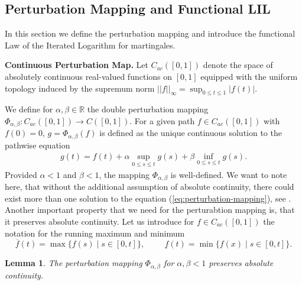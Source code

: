 \documentclass[11pt]{article}
\newtheorem{lemma}{Lemma}[section]
\theoremstyle{remark}
\newcommand{\R}{\mathbb{R}}
\begin{document}
\subsection{Perturbation Mapping and Functional LIL}
In this section we define the perturbation mapping and introduce the functional Law of the Iterated Logarithm for martingales.

\textbf{Continuous Perturbation Map.} Let $C_{ac}([0,1])$ denote the space of absolutely continuous real-valued functions on $[0,1]$ equipped with the uniform topology induced by the supremum norm $||f||_\infty = \sup_{0 \leq t \leq 1} |f(t)|$.

We define for $\alpha,\beta\in\R$ the double perturbation mapping $\Phi_{\alpha,\beta}: C_{ac}([0,1]) \to C([0,1])$. For a given path $f \in C_{ac}([0,1])$ with $f(0)=0$, $g = \Phi_{\alpha,\beta}(f)$ is defined as the unique continuous solution to the pathwise equation
\begin{align}\label{eq:perturbation-mapping}\tag{PM}
g(t) = f(t) + \alpha \sup_{0 \leq s \leq t} g(s) + \beta \inf_{0 \leq s \leq t} g(s).
\end{align}
Provided $\alpha < 1$ and $\beta < 1$, the mapping $\Phi_{\alpha,\beta}$ is well-defined. We want to note here, that without the additional assumption of absolute continuity, there could exist more than one solution to the equation (\ref{eq:perturbation-mapping}), see \cite{D96}. Another important property that we need for the perturabtion mapping is, that it preserves absolute continuity. Let us introduce for $f\in C_{ac}([0,1])$ the notation for the running maximum and minimum
$$\overline{f}(t)=\max\{f(s)\;|\;s\in[0,t]\},\hspace{1cm}\underline{f}(t)=\min\{f(x)\;|\;s\in[0,t]\}.$$
\begin{lemma}\label{lem:absolute-cont-preserved}
    The perturbation mapping $\Phi_{\alpha,\beta}$ for $\alpha,\beta<1$ preserves absolute continuity.
\end{lemma}
\end{document}
